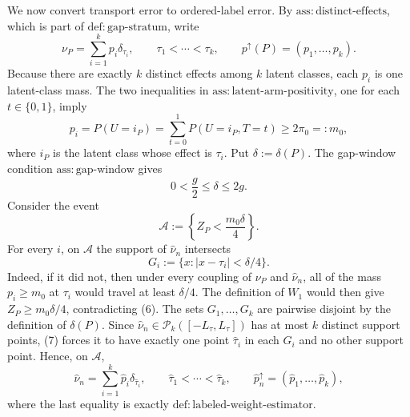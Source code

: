We now convert transport error to ordered-label error.  By \(\mathrm{ass:distinct\text{-}effects}\), which is part of \(\mathrm{def:gap\text{-}stratum}\), write
\[
 \nu_P=\sum_{i=1}^k p_i\delta_{\tau_i},
 \qquad
 \tau_1<\cdots<\tau_k,
 \qquad
 p^{\uparrow}(P)=(p_1,\ldots,p_k).
\]
Because there are exactly \(k\) distinct effects among \(k\) latent classes, each \(p_i\) is one latent-class mass.  The two inequalities in \(\mathrm{ass:latent\text{-}arm\text{-}positivity}\), one for each \(t\in\{0,1\}\), imply
\[
 p_i=P(U=i_P)=\sum_{t=0}^1P(U=i_P,T=t)\ge2\pi_0=:m_0,                       \tag{4}
\]
where \(i_P\) is the latent class whose effect is \(\tau_i\).  Put \(\delta:=\delta(P)\).  The gap-window condition \(\mathrm{ass:gap\text{-}window}\) gives
\[
 0<\frac g2\le\delta\le2g.                                                  \tag{5}
\]
Consider the event
\[
 \mathcal A:=\left\{Z_P<\frac{m_0\delta}{4}\right\}.                       \tag{6}
\]
For every \(i\), on \(\mathcal A\) the support of \(\widehat\nu_n\) intersects
\[
 G_i:=\{x:|x-\tau_i|<\delta/4\}.                                             \tag{7}
\]
Indeed, if it did not, then under every coupling of \(\nu_P\) and \(\widehat\nu_n\), all of the mass \(p_i\ge m_0\) at \(\tau_i\) would travel at least \(\delta/4\).  The definition of \(W_1\) would then give \(Z_P\ge m_0\delta/4\), contradicting (6).  The sets \(G_1,\ldots,G_k\) are pairwise disjoint by the definition of \(\delta(P)\).  Since \(\widehat\nu_n\in\mathcal P_k([-L_{\tau},L_{\tau}])\) has at most \(k\) distinct support points, (7) forces it to have exactly one point \(\widehat\tau_i\) in each \(G_i\) and no other support point.  Hence, on \(\mathcal A\),
\[
 \widehat\nu_n=\sum_{i=1}^k\widehat p_i\delta_{\widehat\tau_i},
 \qquad
 \widehat\tau_1<\cdots<\widehat\tau_k,
 \qquad
 \widehat p_n^{\uparrow}=(\widehat p_1,\ldots,\widehat p_k),                \tag{8}
\]
where the last equality is exactly \(\mathrm{def:labeled\text{-}weight\text{-}estimator}\).

